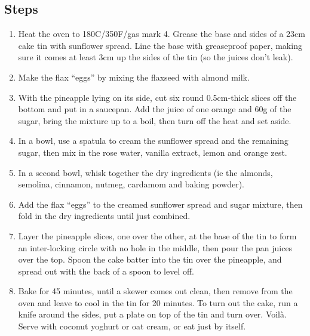 \documentclass{book}
\begin{document}
\subsection*{Steps}
\begin{enumerate}
\item Heat the oven to 180C/350F/gas mark 4. Grease the base and sides of a 23cm cake tin with sunflower spread. Line the base with greaseproof paper, making sure it comes at least 3cm up the sides of the tin (so the juices don’t leak).
\item Make the flax “eggs” by mixing the flaxseed with almond milk.
\item With the pineapple lying on its side, cut six round 0.5cm-thick slices off the bottom and put in a saucepan. Add the juice of one orange and 60g of the sugar, bring the mixture up to a boil, then turn off the heat and set aside.
\item In a bowl, use a spatula to cream the sunflower spread and the remaining sugar, then mix in the rose water, vanilla extract, lemon and orange zest.
\item In a second bowl, whisk together the dry ingredients (ie the almonds, semolina, cinnamon, nutmeg, cardamom and baking powder).
\item Add the flax “eggs” to the creamed sunflower spread and sugar mixture, then fold in the dry ingredients until just combined.
\item Layer the pineapple slices, one over the other, at the base of the tin to form an inter-locking circle with no hole in the middle, then pour the pan juices over the top. Spoon the cake batter into the tin over the pineapple, and spread out with the back of a spoon to level off.
\item Bake for 45 minutes, until a skewer comes out clean, then remove from the oven and leave to cool in the tin for 20 minutes. To turn out the cake, run a knife around the sides, put a plate on top of the tin and turn over. Voilà. Serve with coconut yoghurt or oat cream, or eat just by itself.
\end{enumerate}
\newpage
\end{document}
